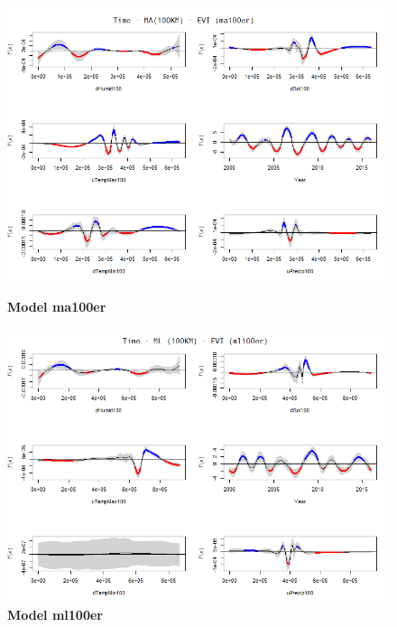 \begin{figure}[H]
 \centering
    \begin{minipage}{0.8\textwidth}
        \centering
        \includegraphics[width=1.2\textwidth]{ma100er.png} %
        \caption{\textbf{Model ma100er}}
    \end{minipage}\hfill
    \begin{minipage}{0.8\textwidth}
        \centering
        \includegraphics[width=1.2\textwidth]{ml100er.png} %
        \caption{\textbf{Model ml100er}}
    \end{minipage}
\end{figure}

